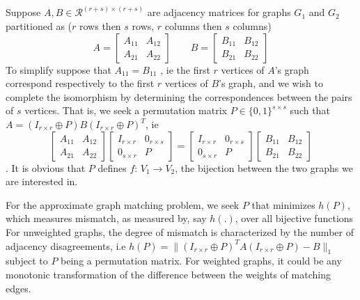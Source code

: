 \documentclass[12pt,oneside,final]{thesis}\usepackage[]{graphicx}\usepackage[]{color}
\begin{document}
Suppose $A,B \in \mathcal{R}^{(r+s)\times (r+s)}$ are adjacency matrices for graphs $G_1$ and $G_2$
 partitioned as ($r$ rows then $s$ rows, $r$ columns then $s$ columns)
\[  A =\left [
\begin{array}{cc} A_{11} & A_{12} \\ A_{21} & A_{22} \end{array} \right ]
\ \ \ \ \ \ \ \ \ B =\left [
\begin{array}{cc} B_{11} & B_{12} \\ B_{21} & B_{22} \end{array} \right ]
\]
To simplify  suppose that $A_{11}=B_{11}$ , ie the first $r$ vertices
of $A$'s graph correspond respectively to the first $r$ vertices of $B$'s graph,
and we wish to complete the isomorphism by determining the correspondences between the pairs of $s$ vertices. 
That is, we seek a permutation matrix $P \in \{0,1\}^{s \times s}$ such that $A=(I_{r \times r}
\oplus P)B(I_{r \times r} \oplus P)^T$, ie
 \[
 \left [
\begin{array}{cc} A_{11} & A_{12} \\ A_{21} & A_{22} \end{array}
\right ]
\left [
\begin{array}{cc} I_{r \times r} & 0_{r \times s} \\ 0_{s \times r} & P \end{array}
\right ]
=
\left [
\begin{array}{cc} I_{r \times r} & 0_{r \times s} \\ 0_{s \times r} & P \end{array}
\right ]
\left [
\begin{array}{cc} B_{11} & B_{12} \\ B_{21} & B_{22} \end{array}
\right ] 
\].  It is obvious that $P$ defines $f$: $V_1 \rightarrow V_2$, the bijection  between the two graphs we are interested in.



For the approximate graph matching problem, we seek $P$ that minimizes $h(P)$, which measures mismatch, as measured by, say $h(.)$, over all bijective functions
For unweighted graphs, the degree of mismatch is characterized by the number of adjacency disagreements, i.e
$h(P)=\|(I_{r \times r}\oplus P)^{T}A(I_{r \times r}\oplus P)-B\|_1$ subject to $P$ being a permutation matrix.
For weighted graphs, it could be any monotonic transformation of the difference between the weights of matching edges.
   
\end{document}
